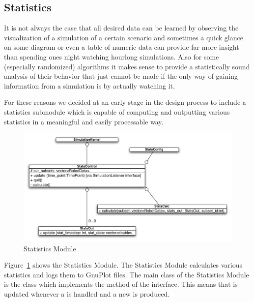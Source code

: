 \subsection{Statistics} \label{sec:statistics}

It is not always the case that all desired data can be learned by observing the visualization of a simulation of a certain scenario and sometimes a quick glance on some diagram or even a table of numeric data can provide far more insight than spending ones night watching hourlong simulations. Also for some (especially randomized) algorithms it makes sense to provide a statistically sound analysis of their behavior that just cannot be made if the only way of gaining information from a simulation is by actually watching it.\smallskip

\noindent
For these reasons we decided at an early stage in the design process to include a statistics submodule which is capable of computing and outputting various statistics in a meaningful and easily processable way.\smallskip

\begin{figure}
\centering\includegraphics[width=0.78\linewidth]{chapter_reference_fig/statistics}
\caption{Statistics Module}\label{fig:statistics}
\end{figure}

Figure~\ref{fig:statistics} shows the Statistics Module. The Statistics Module calculates various statistics and logs them to GnuPlot files. The main class of the Statistics Module is the  class which implements the  method of the  interface. This means that  is updated whenever a  is handled and a new  is produced.\smallskip

